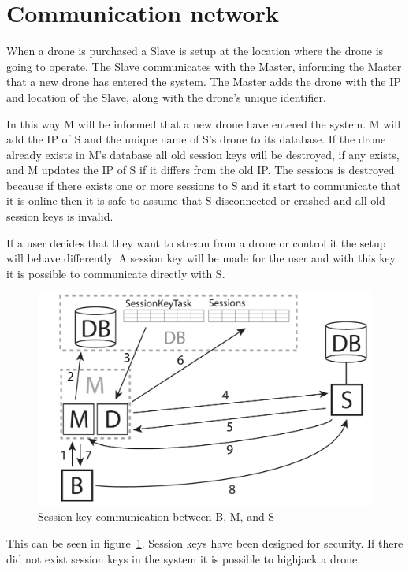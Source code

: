 \section{Communication network}

When a drone is purchased a Slave is setup at the location where the drone is going to operate.
The Slave communicates with the Master, informing the Master that a new drone has entered the system. 
The Master adds the drone with the IP and location of the Slave, along with the drone's unique identifier.


In this way M will be informed that a new drone have entered the system. M will add the IP of S and the unique name of S's drone to its database.
If the drone already exists in M's database all old session keys will be destroyed, if any exists, and M updates the IP of S if it differs from the old IP. The sessions is destroyed because if there exists one or more sessions to S and it start to communicate that it is online then it is safe to assume that S disconnected or crashed and all old session keys is invalid.

If a user decides that they want to stream from a drone or control it the setup will behave differently. A session key will be made for the user and with this key it is possible to communicate directly with S.

\begin{figure}[htb]
    \centering 
    \includegraphics[width=\textwidth]{gfx/sessionkey_communication.pdf}
    \caption{Session key communication between B, M, and S}
    \label{fig:sessionkey_communication}
\end{figure}

This can be seen in figure~\ref{fig:sessionkey_communication}. Session keys have been designed for security. If there did not exist session keys in the system it is possible to highjack a drone.

